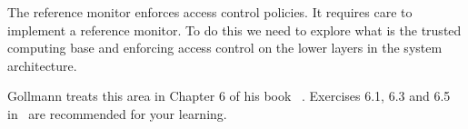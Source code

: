 The reference monitor enforces access control policies.
It requires care to implement a reference monitor.
To do this we need to explore what is the trusted computing base and enforcing 
access control on the lower layers in the system architecture.

Gollmann treats this area in Chapter 6 of his book 
~\cite{Gollmann2011cs}.
Exercises 6.1, 6.3 and 6.5 in~\cite{Gollmann2011cs} are recommended for your 
learning.
